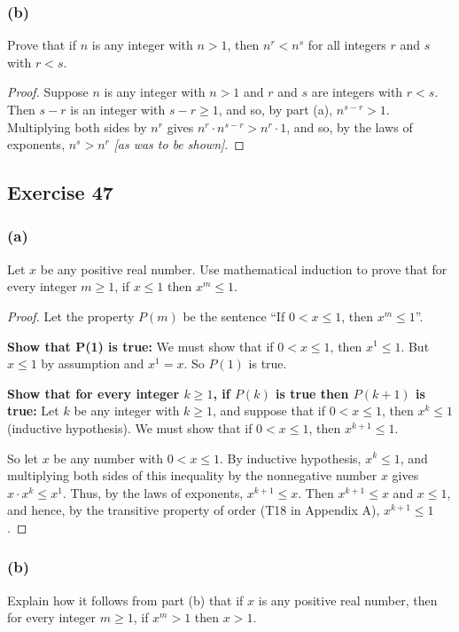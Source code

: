 \documentclass[14pt]{extarticle}
\begin{document}
\subsubsection{(b)}
Prove that if \(n\) is any integer with \(n > 1\), then \(n^r < n^s\) for all integers \(r\) and \(s\) with \(r < s\).

\begin{proof}
Suppose \(n\) is any integer with \(n > 1\) and \(r\) and \(s\) are integers with \(r < s\). Then \(s - r\) is an integer 
with \(s - r \geq 1\), and so, by part (a), \(n^{s-r} > 1\). Multiplying both sides by \(n^r\) gives \(n^r \cdot n^{s-r} > 
n^r \cdot 1\), and so, by the laws of exponents, \(n^s > n^r\) {\it [as was to be shown]}.
\end{proof}

\subsection{Exercise 47}
\subsubsection{(a)}
Let \(x\) be any positive real number. Use mathematical induction to prove that for every integer \(m \geq 1\), if 
\(x \leq 1\) then \(x^m \leq 1\).

\begin{proof}
Let the property \(P(m)\) be the sentence ``If \(0 < x \leq 1\), then \(x^m \leq 1\)''. 

{\bf Show that P(1) is true:} We must show that if \(0 < x \leq 1\), then \(x^1 \leq 1\). But \(x \leq 1\) by assumption 
and \(x^1 = x\). So \(P(1)\) is true.

{\bf Show that for every integer \(k \geq 1\), if \(P(k)\) is true then \(P(k + 1)\) is true:} Let \(k\) be any integer with 
\(k \geq 1\), and suppose that if \(0 < x \leq 1\), then \(x^k \leq 1\) (inductive hypothesis). We must show that if 
\(0 < x \leq 1\), then \(x^{k+1} \leq 1\). 

So let \(x\) be any number with \(0 < x \leq 1\). By inductive hypothesis, \(x^k \leq 1\), and multiplying both sides of this 
inequality by the nonnegative number \(x\) gives \(x \cdot x^k \leq x^1\). Thus, by the laws of exponents, \(x^{k+1}\leq x\). 
Then \(x^{k+1} \leq x\) and \(x \leq 1\), and hence, by the transitive property of order (T18 in Appendix A), 
\(x^{k+1} \leq 1\).
\end{proof}

\subsubsection{(b)}
Explain how it follows from part (b) that if \(x\) is any positive real number, then for every integer \(m \geq 1\), if 
\(x^m > 1\) then \(x > 1\).
\end{document}
